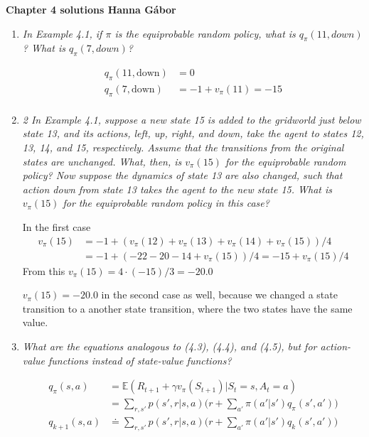 \documentclass[12pt,a4paper]{article}
\begin{document}
\textbf{Chapter 4 solutions  \hfill Hanna Gábor}

\begin{enumerate}
  \item
    \textit{In Example 4.1, if $\pi$ is the equiprobable random policy, what is $q_\pi(11, down)$?
    What is $q_\pi(7, down)$?}

    \begin{align*}
    q_\pi(11, \text{down}) &= 0\\
    q_\pi(7, \text{down}) &= -1 + v_\pi(11) = -15\\
    \end{align*}

  \item
    \textit{2 In Example 4.1, suppose a new state 15 is added to the gridworld just below
    state 13, and its actions, left, up, right, and down, take the agent to states 12, 13, 14,
    and 15, respectively. Assume that the transitions from the original states are unchanged.
    What, then, is $v_\pi(15)$ for the equiprobable random policy? Now suppose the dynamics of
    state 13 are also changed, such that action down from state 13 takes the agent to the new
    state 15. What is $v_\pi(15)$ for the equiprobable random policy in this case?}

    In the first case
    \begin{align*}
      v_\pi(15) &= -1 + (v_\pi(12) + v_\pi(13) + v_\pi(14) + v_\pi(15))/4\\
      &=-1 + (- 22 - 20 - 14 + v_\pi(15))/4 = -15 + v_\pi(15)/4
    \end{align*}
    From this $v_\pi(15) = 4 \cdot (-15) /3 = - 20.0$

    $v_\pi(15) = - 20.0$ in the second case as well, because we changed a state
    transition to a another state transition, where the two states have the same value.

  \item
    \textit{What are the equations analogous to (4.3), (4.4), and (4.5), but for action-value
    functions instead of state-value functions?}

    \begin{align*}
      q_\pi(s, a) &= \mathbb{E}(R_{t + 1} + \gamma v_\pi (S_{t + 1})|S_t = s, A_t = a )\\
      &= \sum\limits_{r, s'} p(s', r | s, a) \Big(r + \sum\limits_{a'} \pi(a'|s') q_\pi(s', a')\Big)\\
      q_{k + 1}(s, a) &\doteq \sum\limits_{r, s'} p(s', r | s, a) \Big(r + \sum\limits_{a'} \pi(a'|s') q_k(s', a')\Big)
    \end{align*}


\end{enumerate}
\end{document}
